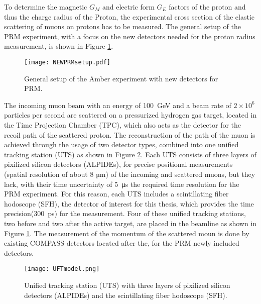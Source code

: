 To determine the magnetic $G_M$ and electric form $G_E$ factors of the proton and thus the charge radius of the Proton,
the experimental cross section of the elastic scattering of muons on protons has to be measured.
The general setup of the PRM experiment, with a focus on the new detectors needed for the proton radius measurement, is shown in Figure \ref{fig:amber_setup}.
\begin{figure}[H]
	\centering
	\texttt{[image: NEWPRMsetup.pdf]}
	\caption{General setup of the Amber experiment with new detectors for PRM.\autocite{InternalcommunicationKarl}}
	\label{fig:amber_setup}
\end{figure}
The incoming muon beam with an energy of \SI{100} {\giga\electronvolt}\autocite{ProposalAmber} and a beam rate of $2 \times 10^6$\autocite{ConfrancePaperDAQ} particles per second are scattered on a pressurized hydrogen gas target,
located in the Time Projection Chamber (TPC), 
which also acts as the detector for the recoil path of the scattered proton.
\newline
The reconstruction of the path of the muon is achieved through the usage of two detector types,
combined into one unified tracking station (UTS) as shown in Figure \ref{UTSpicture}.
\newline
Each UTS consists of three layers of pixilized silicon detectors (ALPIDEs), for precise positional measurements (spatial resolution of about 8 µm\autocite{Amber2022Status}) of the incoming and scattered muons, 
but they lack, with their time uncertainty of \SI{5} {\micro\second}\autocite{Amber2022Status} the required time resolution for the PRM experiment.
For this reason, each UTS includes a scintillating fiber hodoscope (SFH), the detector of interest for this thesis,
which provides the time precision(\SI{300} {\pico\second}\Autocite{Amber2022Status}) for the measurement.
\newline
Four of these unified tracking stations, two before and two after the active target, are placed in the beamline as shown in Figure \ref{fig:amber_setup}.
The measurement of the momentum of the scattered moun is done by existing COMPASS detectors located after the, 
for the PRM newly included detectors\autocite{ProposalAmber}.

\begin{figure}[H]	
	\centering
	\texttt{[image: UFTmodel.png]}
	\caption{Unified tracking station (UTS) with three layers of pixilized silicon detectors (ALPIDEs) and the scintillating fiber hodoscope (SFH).\autocite{InternalcommunicationKarl}}
	\label{UTSpicture}
\end{figure}

